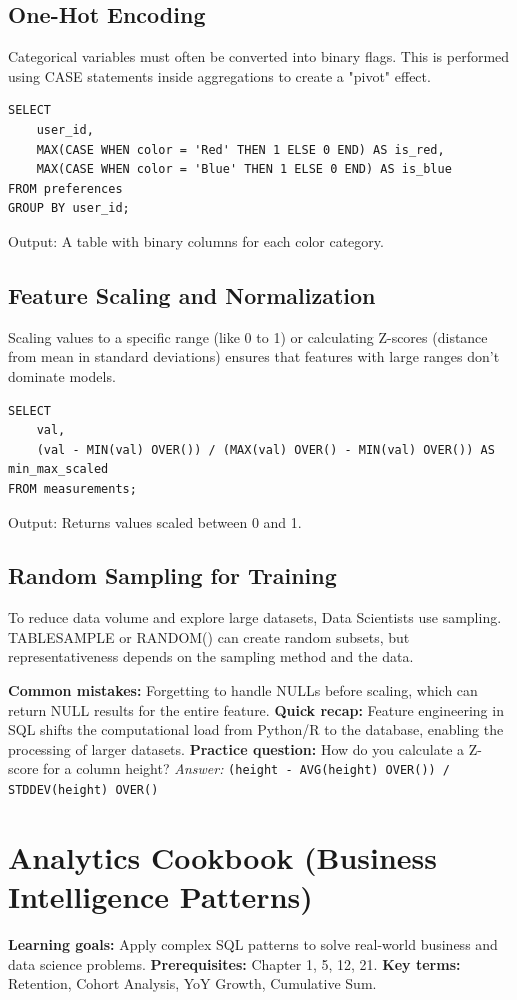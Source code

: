 \documentclass[12pt, a4paper]{article}
\begin{document}
\subsection{One-Hot Encoding}
Categorical variables must often be converted into binary flags. This is performed using CASE statements inside aggregations to create a "pivot" effect.

\begin{verbatim}
SELECT 
    user_id,
    MAX(CASE WHEN color = 'Red' THEN 1 ELSE 0 END) AS is_red,
    MAX(CASE WHEN color = 'Blue' THEN 1 ELSE 0 END) AS is_blue
FROM preferences
GROUP BY user_id;
\end{verbatim}
Output: A table with binary columns for each color category.

\subsection{Feature Scaling and Normalization}
Scaling values to a specific range (like 0 to 1) or calculating Z-scores (distance from mean in standard deviations) ensures that features with large ranges don't dominate models.

\begin{verbatim}
SELECT 
    val,
    (val - MIN(val) OVER()) / (MAX(val) OVER() - MIN(val) OVER()) AS min_max_scaled
FROM measurements;
\end{verbatim}
Output: Returns values scaled between 0 and 1.

\subsection{Random Sampling for Training}
To reduce data volume and explore large datasets, Data Scientists use sampling. TABLESAMPLE or RANDOM() can create random subsets, but representativeness depends on the sampling method and the data.

\textbf{Common mistakes:} Forgetting to handle NULLs before scaling, which can return NULL results for the entire feature.
\textbf{Quick recap:} Feature engineering in SQL shifts the computational load from Python/R to the database, enabling the processing of larger datasets.
\textbf{Practice question:} How do you calculate a Z-score for a column height?
\textit{Answer:} \texttt{(height - AVG(height) OVER()) / STDDEV(height) OVER()}

\section{Analytics Cookbook (Business Intelligence Patterns)}
\textbf{Learning goals:} Apply complex SQL patterns to solve real-world business and data science problems.
\textbf{Prerequisites:} Chapter 1, 5, 12, 21.
\textbf{Key terms:} Retention, Cohort Analysis, YoY Growth, Cumulative Sum.
\end{document}
